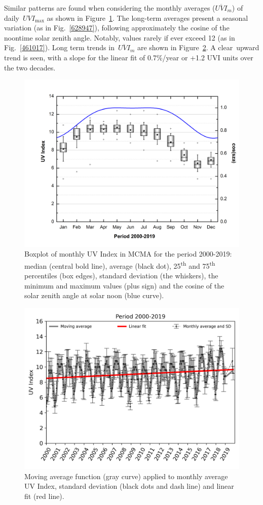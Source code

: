 \documentclass[10pt]{article}
\begin{document}
Similar patterns are found when considering the monthly averages
(\(\overline{UVI}_m\)) of daily~\(UVI_{\max}\) as shown in
Figure~{\ref{310112}}. The long-term averages present a
seasonal variation (as in Fig.~{\ref{628947}}),
following approximately the cosine of the noontime solar zenith angle.
Notably, values rarely if ever exceed 12 (as in
Fig.~{\ref{461017}}). Long term trends
in~\(\overline{UVI}_m\) are shown in
Figure~{\ref{185758}}. A clear~upward trend is seen,
with a slope for the linear fit of 0.7\%/year or +1.2 UVI units over the
two decades.
\begin{figure}[H]
\begin{center}
\includegraphics[width=0.70\columnwidth]{figures/Boxplotcos/Boxplotcos}
\caption{{Boxplot of monthly UV Index in MCMA for the period 2000-2019: median
(central bold line), average (black dot), 25\textsuperscript{th} and
75\textsuperscript{th} percentiles (box edges), standard deviation (the
whiskers), the minimum and maximum values (plus sign) and the cosine of
the solar zenith angle at solar noon (blue curve).
{\label{310112}}%
}}
\end{center}
\end{figure}
\begin{figure}[H]
\begin{center}
\includegraphics[width=0.70\columnwidth]{figures/CloudDaily/UVyearlyError}
\caption{{Moving average function (gray curve) applied to monthly average UV
Index, standard deviation (black dots and dash line) and linear fit (red
line).
{\label{185758}}%
}}
\end{center}
\end{figure}
\end{document}
